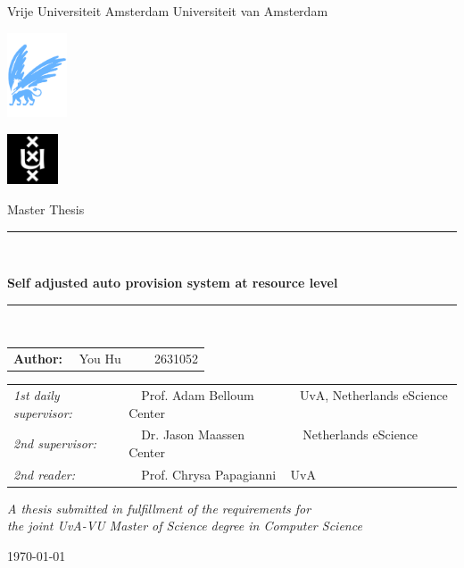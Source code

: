 \documentclass[twoside,11pt]{Latex/Classes/PhDthesisPSnPDF}
\begin{document}
\thispagestyle{empty}

\begin{center}

Vrije Universiteit Amsterdam \hspace*{2cm} Universiteit van Amsterdam

\vspace{1mm}

\hspace*{-7.5cm}\includegraphics[height=25mm]{0_frontmatter/figures/vu-griffioen.pdf}

\vspace*{-2cm}\hspace*{7.5cm}\includegraphics[height=15mm]{0_frontmatter/figures/uva_logo.jpg}

\vspace{2cm}

{\Large Master Thesis}

\vspace*{1.5cm}

\rule{.9\linewidth}{.6pt}\\[0.4cm]
{\huge \bfseries Self adjusted auto provision system at resource level \par}\vspace{0.4cm}
\rule{.9\linewidth}{.6pt}\\[1.5cm]

\vspace*{2mm}

{\Large
\begin{tabular}{l}
{\bf Author:} ~~You Hu ~~~~ 2631052
\end{tabular}
}

\vspace*{2cm}

\begin{tabular}{ll}
{\it 1st daily supervisor:}   & ~~Prof. Adam Belloum ~~~~~~ UvA, Netherlands eScience Center \\
{\it 2nd  supervisor:} & ~~Dr. Jason Maassen ~~~~~~~~ Netherlands eScience Center \\
{\it 2nd reader:}       & ~~Prof. Chrysa Papagianni ~ UvA
\end{tabular}

\vspace*{2.5cm}

\textit{A thesis submitted in fulfillment of the requirements for\\ the joint UvA-VU Master of Science degree in Computer Science}

\vspace*{1.8cm}

\today\\[4cm] %

\end{center}
\end{document}
